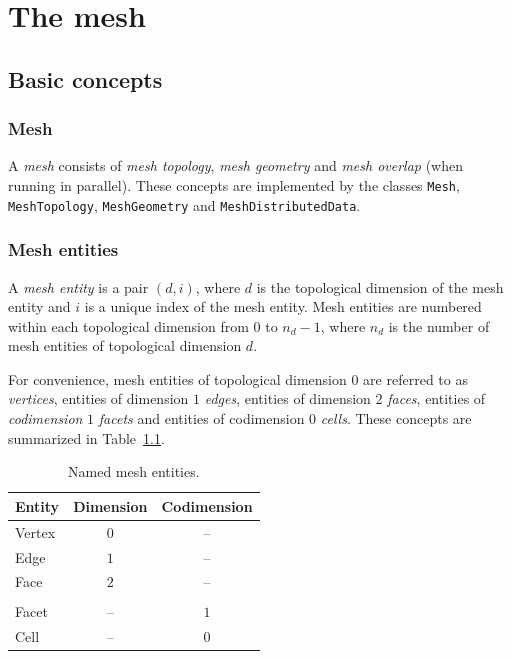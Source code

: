 \chapter{The mesh}


\section{Basic concepts}

\subsection{Mesh}

A \emph{mesh} consists of \emph{mesh topology}, \emph{mesh geometry}
and \emph{mesh overlap} (when running in parallel).  These concepts
are implemented by the classes \texttt{Mesh}, \texttt{MeshTopology},
\texttt{MeshGeometry} and \texttt{MeshDistributedData}.

\subsection{Mesh entities}


A \emph{mesh entity} is a pair $(d, i)$, where $d$ is the topological
dimension of the mesh entity and $i$ is a unique index of the mesh
entity. Mesh entities are numbered within each topological dimension
from $0$ to $n_d-1$, where $n_d$ is the number of mesh entities of
topological dimension $d$.

For convenience, mesh entities of topological dimension $0$ are
referred to as \emph{vertices}, entities of dimension $1$
\emph{edges}, entities of dimension $2$ \emph{faces}, entities of
\emph{codimension} $1$ \emph{facets} and entities of codimension $0$
\emph{cells}. These concepts are summarized in
Table~\ref{tab:entities,here}.

\begin{table}[htbp]
  \begin{center}
    \begin{tabular}{|l|c|c|}
      \hline
      Entity & Dimension & Codimension \\
      \hline
      Vertex & $0$       & -- \\
      Edge   & $1$       & -- \\
      Face   & $2$       & -- \\
      & & \\
      Facet  & --      &  $1$ \\
      Cell   & --      &  $0$ \\
      \hline
    \end{tabular}
    \caption{Named mesh entities.}
    \label{tab:entities,here}
  \end{center}
\end{table}

